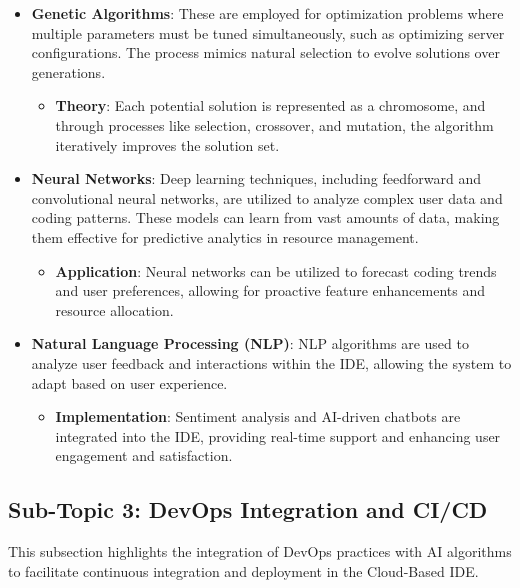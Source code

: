 \documentclass[12pt,a4paper,final]{report}
\begin{document}
\begin{itemize}
 
    \item \textbf{Genetic Algorithms}: These are employed for optimization problems where multiple parameters must be tuned simultaneously, such as optimizing server configurations. The process mimics natural selection to evolve solutions over generations.
    \begin{itemize}
        \item \textbf{Theory}: Each potential solution is represented as a chromosome, and through processes like selection, crossover, and mutation, the algorithm iteratively improves the solution set.
    \end{itemize}

    \item \textbf{Neural Networks}: Deep learning techniques, including feedforward and convolutional neural networks, are utilized to analyze complex user data and coding patterns. These models can learn from vast amounts of data, making them effective for predictive analytics in resource management.
    \begin{itemize}
        \item \textbf{Application}: Neural networks can be utilized to forecast coding trends and user preferences, allowing for proactive feature enhancements and resource allocation.
    \end{itemize}

    \item \textbf{Natural Language Processing (NLP)}: NLP algorithms are used to analyze user feedback and interactions within the IDE, allowing the system to adapt based on user experience. 
    \begin{itemize}
        \item \textbf{Implementation}: Sentiment analysis and AI-driven chatbots are integrated into the IDE, providing real-time support and enhancing user engagement and satisfaction.
    \end{itemize}
\end{itemize}

\subsection{Sub-Topic 3: DevOps Integration and CI/CD}

This subsection highlights the integration of DevOps practices with AI algorithms to facilitate continuous integration and deployment in the Cloud-Based IDE.
\end{document}
